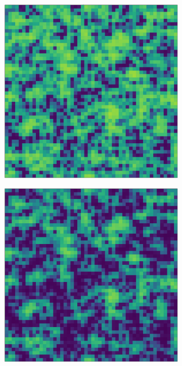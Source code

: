 \documentclass[../main.tex]{subfiles}
\begin{document}
\begin{figure}[H]
\begin{subfigure}[b]{0.11\textwidth}
    \end{subfigure}
    \hfill
    \begin{subfigure}[b]{0.11\textwidth}
        \centering 
        \includegraphics[keepaspectratio, width = \linewidth]{../figures/fig3.8.2.7.png}
    \end{subfigure}
    \hfill
    \begin{subfigure}[b]{0.11\textwidth}
        \centering 
        \includegraphics[keepaspectratio, width = \linewidth]{../figures/fig3.8.2.8.png}

\end{subfigure}
\end{figure}
\end{document}
